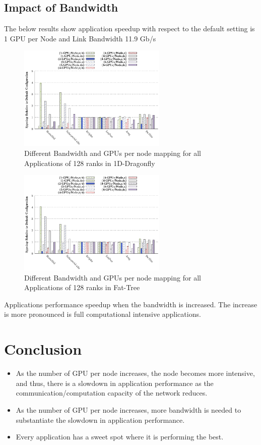 \documentclass[conference]{IEEEtran}
\begin{document}
\subsection{Impact of Bandwidth}
The below results show application speedup with respect to the default setting is 1 GPU per Node and Link Bandwidth 11.9 Gb/s
\begin{figure}[H]
\centering
\centering
\includegraphics[width=1\linewidth, height=5cm]{figs/dfly-bw-mapping-all.eps}
\caption{Different Bandwidth and GPUs per node mapping for all Applications of 128 ranks in 1D-Dragonfly}
\end{figure}

\begin{figure}[H]
\centering

\centering
\includegraphics[width=1\linewidth, height=5cm]{figs/ftree-bw-mapping-all.eps}
\caption{Different  Bandwidth and GPUs per node mapping for all Applications of 128 ranks in Fat-Tree}

\end{figure}

Applications performance speedup when the bandwidth is increased.
The increase is more pronounced is full computational intensive applications.

\section{Conclusion}
\begin{itemize}
    \item As the number of GPU per node increases, the node becomes more intensive, and thus, there is a slowdown in application performance as the communication/computation capacity of the network reduces.
    \item As the number of GPU per node increases, more bandwidth is needed to substantiate the slowdown in application performance.
    \item Every application has a sweet spot where it is performing the best.
\end{itemize}
\end{document}
